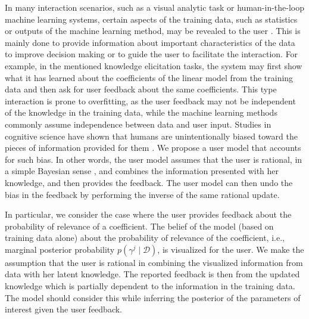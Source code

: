 \documentclass[dissertation,math,vertlayout,pdfa,colorlinks]{aaltoseries}
\newcommand{\bD}{\mathcal{D}}
\begin{document}
In many interaction scenarios, such as a visual analytic task or human-in-the-loop machine learning systems, certain aspects of the training data, such as statistics or outputs of the machine learning method, may be revealed to the user  \cite{BEAMES_Endert,sacha2017you,Homayun_pairwise_UMAP,muhlbacher2013partition,Talbot2009,van2011baobabview,Kapoor2010,krause2014infuse,sarkar2015interactive,Micallef_elicitation}. This is mainly done to provide information about important characteristics of the data to improve decision making or to guide the user to facilitate the interaction. For example, in the mentioned knowledge elicitation tasks, the system may first show what it has learned about the coefficients of the linear model from the training data and then ask for user feedback about the same coefficients. This type interaction is prone to overfitting, as the user feedback may not be independent of the knowledge in the training data, while the machine learning methods commonly assume independence between data and user input. Studies in cognitive science have shown that humans are unintentionally biased toward the pieces of information provided for them \cite{Tversky1974,garthwaite2005statistical}. We propose a user model that accounts for such bias. In other words, the user model assumes that the user is rational, in a simple Bayesian sense \cite{gershman2015computational}, and combines the information presented with her knowledge, and then provides the feedback. The user model can then undo the bias in the feedback by performing the inverse of the same rational update.

In particular, we consider the case where the user provides feedback about the probability of relevance of a coefficient. The belief of the model (based on training data alone) about the probability of relevance of the coefficient, i.e., marginal posterior probability $p(\gamma^j \mid \bD)$, is visualized for the user. We make the assumption that the user is rational in combining the visualized information from data with her latent knowledge. The reported feedback is then from the updated knowledge which is partially dependent to the information in the training data. The model should consider this while inferring the posterior of the parameters of interest given the user feedback.
 
\end{document}
